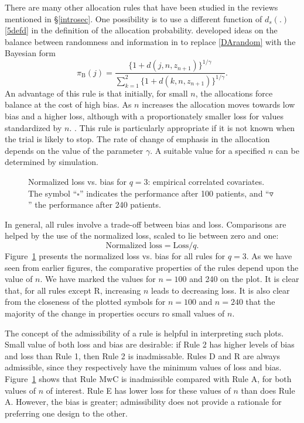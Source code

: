\documentclass[number,12pt,review]{elsarticle}
\begin{document}
There are many other allocation rules that have been studied in the reviews mentioned in \S\ref{introsec}. One possibility is to use a different function of $d_s(.)$ \eqref{5defd} in the definition of the allocation probability. \citet{aca:2002} developed ideas on the balance between randomness and information in \citet{ball+:93} to replace \eqref{DArandom} with the Bayesian form
\begin{equation}
\pi_{\text{B}}(j) = \dfrac{\{1+d(j,n,z_{n+1})\}^{1/\gamma}}{\sum_{k=1}^2\{1+d(k,n,z_{n+1})\}^{1/\gamma}}.
\label{DBrandom}
\end{equation}
An advantage of this rule is that initially, for small $n$, the allocations force balance at the cost of high bias. As $n$ increases the allocation moves towards low bias and a higher loss, although with a proportionately smaller loss for values standardized by $n$. . This rule is particularly appropriate if it is not known when the trial is likely to stop. The rate of change of emphasis in the allocation depends on the value of the parameter $\gamma$. A suitable value for a specified $n$ can be determined by simulation.

\begin{figure}[ht]
  \centering
  \caption{Normalized loss vs. bias for $q=3$: empirical correlated covariates. The symbol ``$\square$'' indicates the performance after
	100 patients, and ``$\smalltriangledown$'' the performance after 240 patients.}
  \label{NormLossBias}
\end{figure}

In general, all rules involve a trade-off between bias and loss. Comparisons are helped by the use of the normalized loss, scaled to lie between zero and one:
\begin{equation}
\text{Normalized loss}=\text{Loss}/{q}. \nonumber
\end{equation}
Figure~\ref{NormLossBias} presents the normalized loss vs. bias for all rules for $q=3$. As we have seen from earlier figures, the comparative properties of the rules depend upon the value of $n$. We have marked the values for $n = 100$ and 240 on the plot. It is clear that, for all rules except R, increasing $n$ leads to decreasing loss. It is also clear from the closeness of the plotted symbols for $n = 100$ and $n = 240$ that the majority of the change in properties occurs ro small values of $n$.

 The concept of the  admissibility of a rule \citep{aca:2002} is helpful in interpreting such plots. Small value of both loss and bias are desirable: if Rule 2 has higher levels of bias and loss than Rule 1, then Rule 2 is inadmissable. Rules D and R are always admissible, since they respectively have the minimum values of loss and bias. Figure~\ref{NormLossBias} shows that Rule MwC is inadmissible compared with Rule A, for both values of $n$ of interest. Rule E has lower loss for these values of $n$ than does Rule A. However, the bias is greater; admissibility does not provide a rationale for preferring one design to the other.
\end{document}
